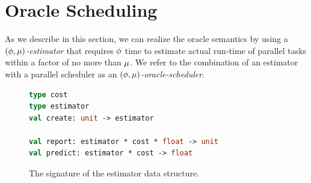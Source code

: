 \section{Oracle Scheduling}
\label{sec:scheduling}
\label{sec:schedule}

As we
describe in this section, we can realize the oracle semantics by using
a {\em $({\phi},{\mu})$-estimator} that requires ${\phi}$ time to
estimate actual run-time of parallel tasks within a factor of no more
than ${\mu}$.  We refer to the combination of an estimator with a
parallel scheduler as an {\em $({\phi},{\mu})$-oracle-scheduler}. 

\begin{figure}
\small
\begin{lstlisting}[language=ocaml]
type cost
type estimator
val create: unit -> estimator

val report: estimator * cost * float -> unit
val predict: estimator * cost -> float
\end{lstlisting}
\caption{The signature of the estimator data structure.}
\label{fig:estimator-sig}
\end{figure}



